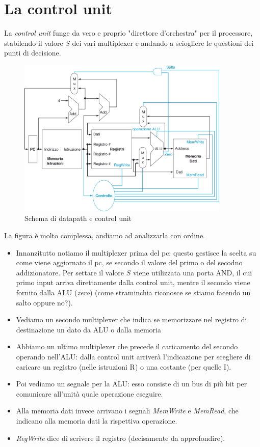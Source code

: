\documentclass[class=book, crop=false, oneside]{standalone}
\begin{document}
\section{La control unit}
La \emph{control unit} funge da vero e proprio "direttore d'orchestra" per il processore, stabilendo il valore \(S\) dei vari multiplexer e andando a sciogliere le questioni dei punti di decisione.
\begin{figure}[H]
	\centering
	\includegraphics[width=0.9\textwidth,keepaspectratio]{datap_2}
	\caption{Schema di datapath e control unit}
\end{figure}
La figura è molto complessa, andiamo ad analizzarla con ordine.
\begin{itemize}
	\item Innanzitutto notiamo il multiplexer prima del pc: questo gestisce la scelta su come viene aggiornato il pc, se secondo il valore del primo o del secodno addizionatore. Per settare il valore \(S\) viene utilizzata una porta AND, il cui primo input arriva direttamente dalla control unit, mentre il secondo viene fornito dalla ALU (\emph{zero}) (come straminchia riconosce se stiamo facendo un salto oppure no?).
	\item Vediamo un secondo multiplexer che indica se memorizzare nel registro di destinazione un dato da ALU o dalla memoria
	\item Abbiamo un  ultimo multiplexer che precede il caricamento del secondo operando nell'ALU: dalla control unit arriverà l'indicazione per scegliere di caricare un registro (nelle istruzioni R) o una costante (per quelle I).
	\item Poi vediamo un segnale per la ALU: esso consiste di un bus di più bit per comunicare all'unità quale operazione eseguire.
	\item Alla memoria dati invece arrivano i segnali \emph{MemWrite} e \emph{MemRead}, che indicano alla memoria dati  la rispettiva operazione.
	\item \emph{RegWrite} dice di scrivere il registro (decisamente da approfondire).
\end{itemize}
\end{document}
